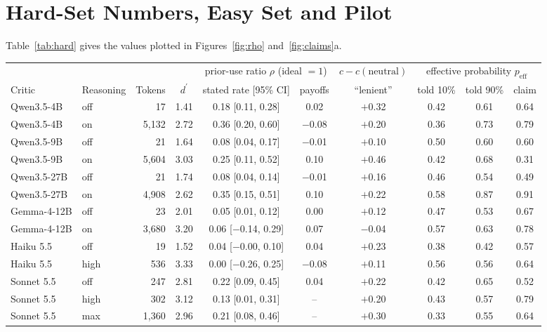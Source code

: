 \documentclass[letterpaper]{article} %
\newcommand{\dprime}{d^{\prime}}
\newcommand{\peff}{p_{\mathrm{eff}}}
\begin{document}
\section{Hard-Set Numbers, Easy Set and Pilot}

Table~\ref{tab:hard} gives the values plotted in Figures~\ref{fig:rho} and~\ref{fig:claims}a.

\begin{table}[t]
\centering
\footnotesize
\begin{tabular}{@{}llrccccccc@{}}
\toprule
& & & & \multicolumn{2}{c}{prior-use ratio $\rho$ (ideal $=1$)} & $c-c(\text{neutral})$ & \multicolumn{3}{c}{effective probability $\peff$} \\
\cmidrule(lr){5-6}\cmidrule(lr){7-7}\cmidrule(l){8-10}
Critic & Reasoning & Tokens & $\dprime$ & stated rate [95\% CI] & payoffs & ``lenient'' & told 10\% & told 90\% & claim \\
\midrule
Qwen3.5-4B & off & 17 & 1.41 & 0.18 [0.11, 0.28] & 0.02 & $+$0.32 & 0.42 & 0.61 & 0.64 \\
Qwen3.5-4B & on & 5,132 & 2.72 & 0.36 [0.20, 0.60] & $-$0.08 & $+$0.20 & 0.36 & 0.73 & 0.79 \\
Qwen3.5-9B & off & 21 & 1.64 & 0.08 [0.04, 0.17] & $-$0.01 & $+$0.10 & 0.50 & 0.60 & 0.60 \\
Qwen3.5-9B & on & 5,604 & 3.03 & 0.25 [0.11, 0.52] & 0.10 & $+$0.46 & 0.42 & 0.68 & 0.31 \\
Qwen3.5-27B & off & 21 & 1.74 & 0.08 [0.04, 0.14] & $-$0.01 & $+$0.16 & 0.46 & 0.54 & 0.49 \\
Qwen3.5-27B & on & 4,908 & 2.62 & 0.35 [0.15, 0.51] & 0.10 & $+$0.22 & 0.58 & 0.87 & 0.91 \\
Gemma-4-12B & off & 23 & 2.01 & 0.05 [0.01, 0.12] & 0.00 & $+$0.12 & 0.47 & 0.53 & 0.67 \\
Gemma-4-12B & on & 3,680 & 3.20 & 0.06 [$-$0.14, 0.29] & 0.07 & $-$0.04 & 0.57 & 0.63 & 0.78 \\
\midrule
Haiku 5.5 & off & 19 & 1.52 & 0.04 [$-$0.00, 0.10] & 0.04 & $+$0.23 & 0.38 & 0.42 & 0.57 \\
Haiku 5.5 & high & 536 & 3.33 & 0.00 [$-$0.26, 0.25] & $-$0.08 & $+$0.11 & 0.56 & 0.56 & 0.64 \\
Sonnet 5.5 & off & 247 & 2.81 & 0.22 [0.09, 0.45] & 0.04 & $+$0.22 & 0.42 & 0.65 & 0.52 \\
Sonnet 5.5 & high & 302 & 3.12 & 0.13 [0.01, 0.31] & -- & $+$0.20 & 0.43 & 0.57 & 0.79 \\
Sonnet 5.5 & max & 1,360 & 2.96 & 0.21 [0.08, 0.46] & -- & $+$0.30 & 0.33 & 0.55 & 0.64 \\

\end{tabular}
\end{table}
\end{document}
